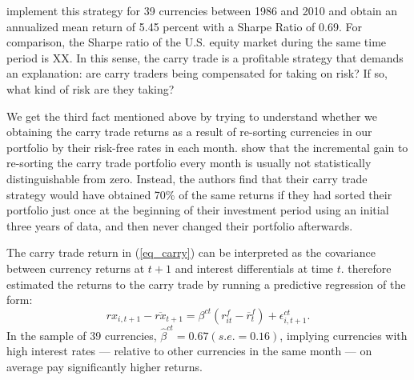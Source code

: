\citet{HassanMano2015} implement this strategy for 39 currencies between 
1986 and 2010 and obtain an annualized mean return of 5.45 percent with 
a Sharpe Ratio of 0.69. For comparison, the Sharpe ratio of the U.S. 
equity market during the same time period is XX. In this sense, the carry 
trade is a profitable strategy that demands an explanation: are carry 
traders being compensated for taking on risk? If so, what kind of 
risk are they taking?

We get the third fact mentioned above by trying to understand whether we
obtaining the carry trade returns as a result of re-sorting currencies in 
our portfolio by their risk-free rates in each month. 
\citet{HassanMano2015} show that the incremental gain to re-sorting the 
carry trade portfolio every month is usually not statistically 
distinguishable from zero. Instead, the authors find that their carry 
trade strategy would have obtained 70\% of the same returns if they had 
sorted their portfolio just once at the beginning of their investment 
period using an initial three years of data, and then never changed their
portfolio afterwards.

The carry trade return in (\ref{eq_carry}) can be interpreted as the 
covariance between currency returns at $t+1$ and interest differentials 
at time $t$. \citet{HassanMano2015} therefore estimated the returns to 
the carry trade by running a predictive regression of the form:
\begin{equation}
  rx_{i,t+1}-\overline{rx}_{t+1}=\beta^{ct}\left(
    r^f_{it}-\overline{r}^f_{t}\right) +\epsilon
  _{i,t+1}^{ct}. 
  \label{eq_ct}
\end{equation} 
In the sample of 39 currencies, $\hat{\beta}^{ct}=0.67 (s.e.=0.16)$, 
implying currencies with high interest rates --- relative to other 
currencies in the same month --- on average pay significantly higher 
returns.




